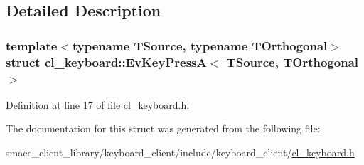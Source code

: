 \subsection{Detailed Description}
\subsubsection*{template$<$typename T\+Source, typename T\+Orthogonal$>$\newline
struct cl\+\_\+keyboard\+::\+Ev\+Key\+Press\+A$<$ T\+Source, T\+Orthogonal $>$}



Definition at line 17 of file cl\+\_\+keyboard.\+h.



The documentation for this struct was generated from the following file\+:\begin{DoxyCompactItemize}
\item 
smacc\+\_\+client\+\_\+library/keyboard\+\_\+client/include/keyboard\+\_\+client/\hyperlink{cl__keyboard_8h}{cl\+\_\+keyboard.\+h}\end{DoxyCompactItemize}

